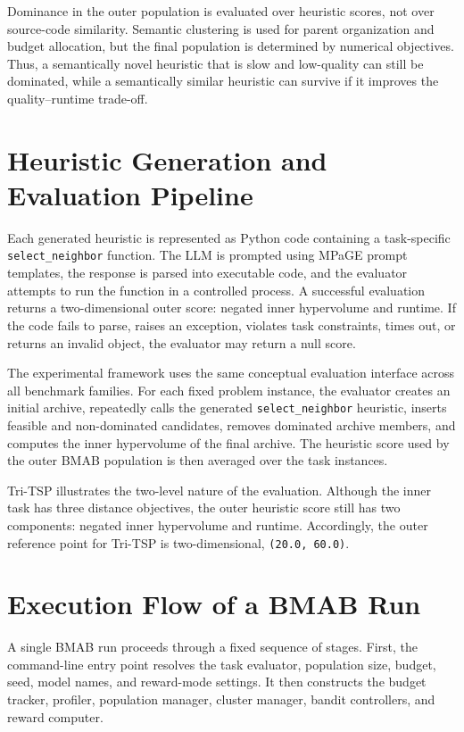 \documentclass[../main.tex]{subfiles}
\begin{document}
Dominance in the outer population is evaluated over heuristic scores, not over source-code similarity. Semantic clustering is used for parent organization and budget allocation, but the final population is determined by numerical objectives. Thus, a semantically novel heuristic that is slow and low-quality can still be dominated, while a semantically similar heuristic can survive if it improves the quality--runtime trade-off.

\section{Heuristic Generation and Evaluation Pipeline}

Each generated heuristic is represented as Python code containing a task-specific \texttt{select\_neighbor} function. The LLM is prompted using MPaGE prompt templates, the response is parsed into executable code, and the evaluator attempts to run the function in a controlled process. A successful evaluation returns a two-dimensional outer score: negated inner hypervolume and runtime. If the code fails to parse, raises an exception, violates task constraints, times out, or returns an invalid object, the evaluator may return a null score.

The experimental framework uses the same conceptual evaluation interface across all benchmark families. For each fixed problem instance, the evaluator creates an initial archive, repeatedly calls the generated \texttt{select\_neighbor} heuristic, inserts feasible and non-dominated candidates, removes dominated archive members, and computes the inner hypervolume of the final archive. The heuristic score used by the outer BMAB population is then averaged over the task instances.

Tri-TSP illustrates the two-level nature of the evaluation. Although the inner task has three distance objectives, the outer heuristic score still has two components: negated inner hypervolume and runtime. Accordingly, the outer reference point for Tri-TSP is two-dimensional, \texttt{(20.0, 60.0)}.

\section{Execution Flow of a BMAB Run}

A single BMAB run proceeds through a fixed sequence of stages. First, the command-line entry point resolves the task evaluator, population size, budget, seed, model names, and reward-mode settings. It then constructs the budget tracker, profiler, population manager, cluster manager, bandit controllers, and reward computer.
\end{document}
